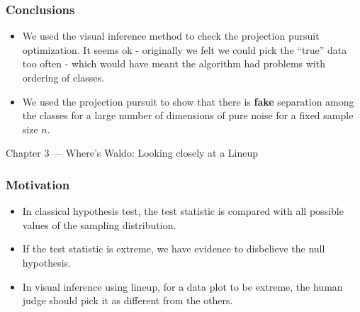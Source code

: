 \documentclass{beamer}
\begin{document}

\begin{frame}
\frametitle{Conclusions}
\begin{itemize}
\item We used the visual inference method to check the projection pursuit optimization. It seems ok - originally we felt we could pick the ``true'' data too often - which would have meant the algorithm had problems with ordering of classes.
\item We used the projection pursuit to show that there is {\bf fake} separation among the classes for a large number of dimensions of pure noise for a fixed sample size $n$.
\end{itemize}
\end{frame}

\begin{frame}
\begin{block}{}
\begin{center} \Large{Chapter 3 --- Where's Waldo: Looking closely at a Lineup} \end{center}
\end{block}
\end{frame}

\begin{frame}
\frametitle{Motivation}
\begin{itemize}
\item In classical hypothesis test, the test statistic is compared with all possible values of the sampling distribution.
\item If the test statistic is extreme, we have evidence to disbelieve the null hypothesis.
\item In visual inference using lineup, for a data plot to be extreme, the human judge should pick it as different from the others.
\end{itemize}
\end{frame}
\end{document}
